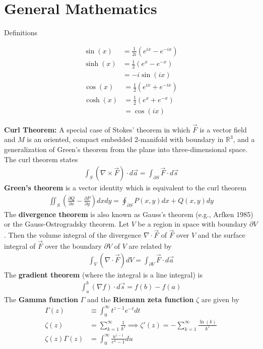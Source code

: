 \chapter{General Mathematics}
\thispagestyle{fancy}
Definitions
\begin{multicols}{2}
	\noindent
	\begin{align}
	\sin(x) &=\frac{1}{2i}(e^{ix}-e^{-ix}) \\
	\sinh(x) &= \frac{1}{2}(e^{x}-e^{-x}) \\
	&= -i\sin(ix)
	\end{align}
	\begin{align}
	\cos(x) &=\frac{1}{2}(e^{ix}+e^{-ix}) \\
	\cosh(x) &=\frac{1}{2}(e^{x}+e^{-x}) \\
	&= \cos(ix)
	\end{align}
\end{multicols}
\textbf{Curl Theorem:} A special case of Stokes' theorem in which $\vec{F}$ is a vector field and $M$ is an oriented, compact embedded 2-manifold with boundary in $\mathbb{R}^3$, and a generalization of Green's theorem from the plane into three-dimensional space. The curl theorem states 
\begin{align}
	\int_S (\nabla \times \vec{F})\cdot d\vec{a} = \int_{\partial S}\vec{F} \cdot d\vec{s}
\end{align}
\textbf{Green's theorem} is a vector identity which is equivalent to the curl theorem 
\begin{align}
	\iint_S \left(\frac{\partial Q}{\partial x}-\frac{\partial P}{\partial y}\right) dxdy = \oint_{\partial S} P(x,y)dx+Q(x,y)dy
\end{align}
The \textbf{divergence theorem} is also known as Gauss's theorem (e.g., Arfken 1985) or the Gauss-Ostrogradsky theorem. Let $V$	 be a region in space with boundary $\partial V$. Then the volume integral of the divergence $\nabla \cdot \vec{F}$ of $\vec{F}$ over $V$ and the surface integral of $\vec{F}$ over the boundary $\partial V$ of $V$ are related by 
\begin{align}
	\int_V (\nabla \cdot \vec{F}) dV = \int_{\partial V}\vec{F} \cdot d\vec{a}
\end{align}
The \textbf{gradient theorem} (where the integral is a line integral) is
\begin{align}
	\int_a^b (\nabla f) \cdot d\vec{s} = f(b)-f(a)
\end{align}
The \textbf{Gamma function} $\Gamma$ and the \textbf{Riemann zeta function} $\zeta$ are given by
\begin{align}
\Gamma(z) &\equiv\int_{0}^{\infty}t^{z-1}e^{-t}dt \\
\zeta(z)&=\sum_{k=1}^{\infty}\frac{1}{k^z}\implies \zeta'(z)=-\sum_{k=1}^{\infty}\frac{\ln(k)}{k^z} \\
\zeta(z)\Gamma(z)&=\int_{0}^{\infty}\frac{u^{z-1}}{e^u-1}du
\end{align}
